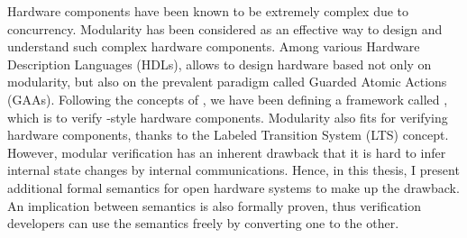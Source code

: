 % 
% 
%

Hardware components have been known to be extremely complex due to
concurrency. Modularity has been considered as an effective way to
design and understand such complex hardware components. Among various
Hardware Description Languages (HDLs), \Bluespec{} allows to design
hardware based not only on modularity, but also on the prevalent
paradigm called Guarded Atomic Actions (GAAs). Following the concepts
of \Bluespec{}, we have been defining a framework called \Kami{},
which is to verify \Bluespec{}-style hardware components. Modularity
also fits for verifying hardware components, thanks to the Labeled
Transition System (LTS) concept. However, modular verification has an
inherent drawback that it is hard to infer internal state changes by
internal communications. Hence, in this thesis, I present additional
formal semantics for open hardware systems to make up the drawback. An
implication between semantics is also formally proven, thus
verification developers can use the semantics freely by converting one
to the other.
